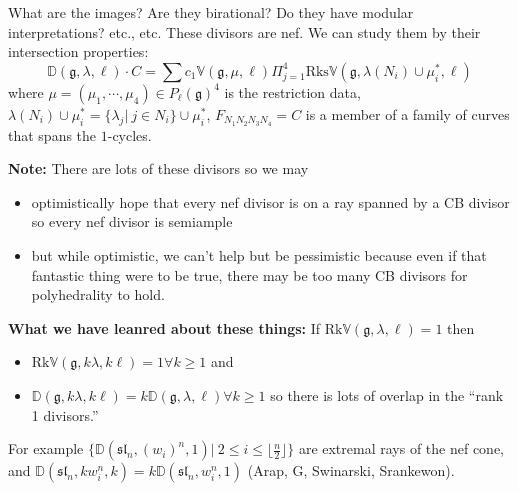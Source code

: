 \documentclass[12pt]{article}
\newcommand{\VV}{\mathbb{V}}
\newcommand{\DD}{\mathbb{D}}
\begin{document}
What are the images?  Are they birational?  Do they have modular interpretations?  etc., etc.  These divisors are nef.  We can study them by their intersection properties:
\[ \DD(\mathfrak{g},\lambda,\ell) \cdot C = \sum c_1 \VV(\mathfrak{g}, \mu, \ell) \Pi_{j=1}^4 \text{Rks} \VV(\mathfrak{g},\lambda(N_i)\cup \mu_i^{\ast}, \ell) \]
where $\mu = (\mu_1,\cdots, \mu_4) \in P_{\ell}(\mathfrak{g})^4$ is the restriction data, $\lambda(N_i)\cup \mu_i^{\ast} = \{ \lambda_j | \: j \in N_i \} \cup \mu_i^{\ast}$, $F_{N_1 N_2 N_3 N_4} = C$ is a member of a family of curves that spans the $1$-cycles.

\textbf{Note:} There are lots of these divisors so we may
\begin{itemize}
\item optimistically hope that every nef divisor is on a ray spanned by a CB divisor so every nef divisor is semiample
\item but while optimistic, we can't help but be pessimistic because even if that fantastic thing were to be true, there may be too many CB divisors for polyhedrality to hold.
\end{itemize}

\textbf{What we have leanred about these things:}
If  $\text{Rk} \VV(\mathfrak{g},\lambda,\ell) = 1$ then
\begin{itemize}
\item $\text{Rk} \VV(\mathfrak{g},k\lambda,k\ell) = 1 \forall k \geq 1 $ and
\item $\DD(\mathfrak{g},k\lambda,k\ell) = k \DD(\mathfrak{g},\lambda,\ell) \forall k \geq 1$
so there is lots of overlap in the ``rank 1 divisors.''
\end{itemize}

For example $\{\DD(\mathfrak{sl}_n,(w_i)^n,1) | \: 2 \leq i \leq \lfloor \frac{n}{2} \rfloor \}$ are extremal rays of the nef cone, and $\DD(\mathfrak{sl}_n,kw_i^n,k) = k \DD(\mathfrak{sl}_n,w_i^n,1)$ (Arap, G, Swinarski, Srankewon).
\end{document}
